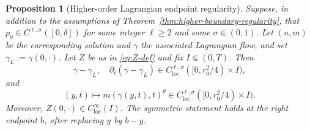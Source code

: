 \documentclass[11pt]{amsart}
\newtheorem{proposition}[theorem]{Proposition}
\newcommand{\loc}{\mathrm{loc}}
\begin{document}
\begin{proposition}[Higher-order Lagrangian endpoint regularity]
\label{prop:finite-endpoint-regularity}
Suppose, in addition to the assumptions of
Theorem~\ref{thm:higher-boundary-regularity}, that
\(p_0\in C^{\ell,\sigma}([0,\delta])\) for some integer \(\ell\ge2\) and
some \(\sigma\in(0,1)\). Let \((u,m)\) be the corresponding solution and
\(\gamma\) the associated Lagrangian flow, and set
\(\gamma_L:=\gamma(0,\cdot)\). Let \(Z\) be as in \eqref{eq:Z-def} and
fix \(I\Subset(0,T)\). Then
\[
        \gamma-\gamma_L,\quad
        \partial_t(\gamma-\gamma_L)\in
        C^{\ell,\sigma}_{\loc}([0,r_0^2/4)\times I),
\]
and
\[
        (y,t)\mapsto m(\gamma(y,t),t)^\theta
        \in C^{\ell,\sigma}_{\loc}([0,r_0^2/4)\times I).
\]
Moreover, \(Z(0,\cdot)\in C^\infty_{\loc}(I)\). The symmetric statement
holds at the right endpoint \(b\), after replacing \(y\) by \(b-y\).
\end{proposition}
\end{document}
